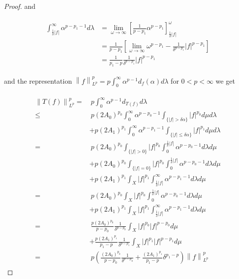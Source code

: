 \begin{proof}
and

\begin{gather}
	\begin{aligned}
		\int_{\frac{1}{\delta}\left| f\right|}^{\infty}\alpha^{p-p_1-1} d\lambda &= \lim_{\omega \to \infty} \left[ \frac{1}{p - p_1} \alpha^{p - p_1}\right]^\omega_{\frac{1}{\delta}\left| f\right|}\\
		&= \frac{1}{p - p_1} \left[ \lim_{\omega \to \infty} \omega^{p - p_1} - \frac{1}{\delta^{p - p_1}} \left| f\right|^{p - p_1}\right]\\
		&= \frac{1}{p_1 - p}\frac{1}{\delta^{p-p_1}} \left| f \right|^{p - p_1}
	\end{aligned}
\end{gather}

and the representation $\displaystyle \left\|f\right\|^p_{L^p} = p \int_0^{\infty} \alpha^{p-1}d_f(\alpha) d\lambda$ for $ 0 < p < \infty$ we get

\begin{gather}
	\begin{aligned}
		\left\|T(f)\right\|^p_{L^p} = &~p\int_0^{\infty}\alpha^{p-1}d_{T(f)} d\lambda\\
		\leq &~p\left(2A_0\right)^{p_0}\int_0^{\infty}\alpha^{p-p_0-1} \int_{\{\left| f \right| > \delta \alpha\}} \left| f\right|^{p_0}d\mu d\lambda\\
		&+ p(2A_1)^{p_1}\int_0^{\infty}\alpha^{p-p_1-1} \int_{\{\left| f \right| \leq \delta \alpha\}} \left| f \right|^{p_1}d\mu d\lambda\\
		= &~p\left(2A_0\right)^{p_0}\int_{\{\left| f \right| > 0\}} \left| f \right|^{p_0} \int_0^{\frac{1}{\delta}\left| f\right|}\alpha^{p-p_0-1} d\lambda d\mu\\
		&+ p\left(2A_0\right)^{p_0}\int_{\{\left| f \right| = 0\}} \left| f \right|^{p_0} \int_0^{\frac{1}{\delta}\left| f\right|}\alpha^{p-p_0-1} d\lambda d\mu\\
		&+ p\left(2A_1\right)^{p_1}\int_X \left| f\right|^{p_1} \int_{\frac{1}{\delta}\left| f\right|}^{\infty}\alpha^{p - p_1 - 1} d\lambda d\mu\\
		= &~p\left(2A_0\right)^{p_0}\int_X \left| f \right|^{p_0} \int_0^{\frac{1}{\delta}\left| f\right|}\alpha^{p-p_0-1} d\lambda d\mu\\
		&+ p\left(2A_1\right)^{p_1}\int_X \left| f\right|^{p_1} \int_{\frac{1}{\delta}\left| f\right|}^{\infty}\alpha^{p - p_1 - 1} d\lambda d\mu\\
		=&~\frac{p\left(2A_0\right)^{p_0}}{p-p_0}\frac{1}{\delta^{p-p_0}}\int_X \left| f \right|^{p_0}\left| f \right|^{p-p_0} d\mu\\
		&+ \frac{p\left(2A_1\right)^{p_1}}{p_1-p}\frac{1}{\delta^{p-p_1}}\int_X \left| f \right|^{p_1} \left| f\right|^{p-p_1}d\mu\\
		= &~p\left( \frac{\left(2A_0\right)^{p_0}}{p - p_0}\frac{1}{\delta^{p - p_0}} + \frac{\left(2A_1\right)^{p_1}}{p_1 - p}\delta^{p_1 - p} \right)\left\|f\right\|_{L^p}^p
	\end{aligned}
	\label{est:Tfp}
\end{gather}


\end{proof}
